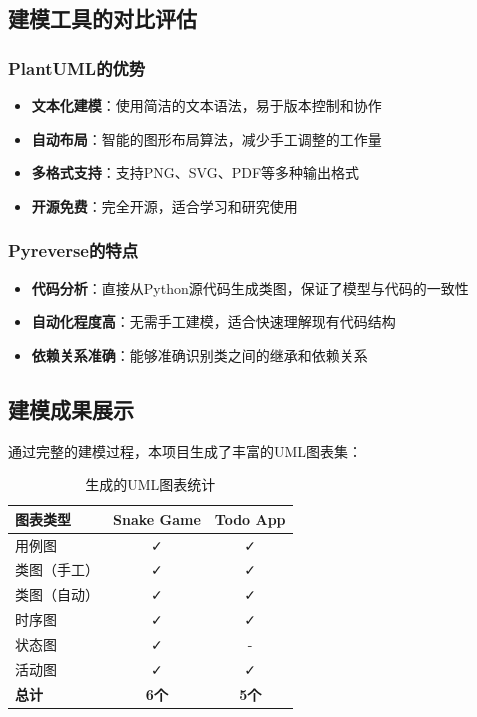 \documentclass[a4paper]{article}
\begin{document}
\subsection{建模工具的对比评估}

\subsubsection{PlantUML的优势}

\begin{itemize}
    \item \textbf{文本化建模}：使用简洁的文本语法，易于版本控制和协作
    \item \textbf{自动布局}：智能的图形布局算法，减少手工调整的工作量
    \item \textbf{多格式支持}：支持PNG、SVG、PDF等多种输出格式
    \item \textbf{开源免费}：完全开源，适合学习和研究使用
\end{itemize}

\subsubsection{Pyreverse的特点}

\begin{itemize}
    \item \textbf{代码分析}：直接从Python源代码生成类图，保证了模型与代码的一致性
    \item \textbf{自动化程度高}：无需手工建模，适合快速理解现有代码结构
    \item \textbf{依赖关系准确}：能够准确识别类之间的继承和依赖关系
\end{itemize}

\subsection{建模成果展示}

通过完整的建模过程，本项目生成了丰富的UML图表集：

\begin{table}[H]
\centering
\caption{生成的UML图表统计}
\begin{tabular}{|l|c|c|}
\hline
\textbf{图表类型} & \textbf{Snake Game} & \textbf{Todo App} \\
\hline
用例图 & ✓ & ✓ \\
\hline
类图（手工） & ✓ & ✓ \\
\hline
类图（自动） & ✓ & ✓ \\
\hline
时序图 & ✓ & ✓ \\
\hline
状态图 & ✓ & - \\
\hline
活动图 & ✓ & ✓ \\
\hline
\textbf{总计} & \textbf{6个} & \textbf{5个} \\
\hline
\end{tabular}
\end{table}
\end{document}
